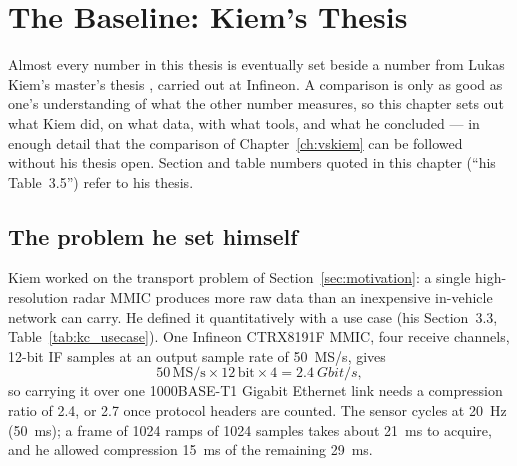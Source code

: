 \chapter{The Baseline: Kiem's Thesis}
\label{ch:kiem}

Almost every number in this thesis is eventually set beside a number from
Lukas Kiem's master's thesis \cite{kiem2025}, carried out at Infineon. A
comparison is only as good as one's understanding of what the other number
measures, so this chapter sets out what Kiem did, on what data, with what
tools, and what he concluded --- in enough detail that the comparison of
Chapter~\ref{ch:vskiem} can be followed without his thesis open. Section and
table numbers quoted in this chapter (``his Table~3.5'') refer to his thesis.

\section{The problem he set himself}
\label{sec:kc_problem}

Kiem worked on the transport problem of Section~\ref{sec:motivation}: a single
high-resolution radar MMIC produces more raw data than an inexpensive
in-vehicle network can carry. He defined it quantitatively with a use case (his
Section~3.3, Table~\ref{tab:kc_usecase}). One Infineon CTRX8191F MMIC, four
receive channels, 12-bit IF samples at an output sample rate of
\SI{50}{MS/s}, gives
\begin{equation}
\label{eq:kc_rate}
50\,\mathrm{MS/s} \times 12\,\mathrm{bit} \times 4 = \SI{2.4}{Gbit/s},
\end{equation}
so carrying it over one 1000BASE-T1 Gigabit Ethernet link needs a compression
ratio of \num{2.4}, or \num{2.7} once protocol headers are counted. The sensor
cycles at \SI{20}{\hertz} (\SI{50}{\milli\second}); a frame of 1024 ramps of
1024 samples takes about \SI{21}{\milli\second} to acquire, and he allowed
compression \SI{15}{\milli\second} of the remaining \SI{29}{\milli\second}.

